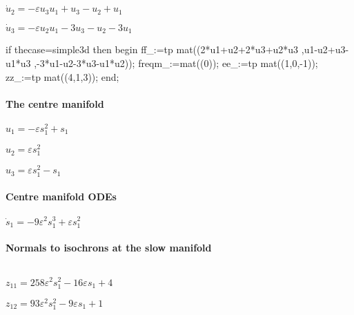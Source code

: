 \documentclass[11pt,a5paper]{article}
\def\eps{\varepsilon}
\begin{document}
\begin{math}
\dot u_{2}=-\varepsilon  u_{3} u_{1}+u_{3}-u_{2}+u_{1}
\end{math}\par

\begin{math}
\dot u_{3}=-\varepsilon  u_{2} u_{1}-3 u_{3}-u_{2}-3 u_{1}
\end{math}

\begin{reduce}
if thecase=simple3d then begin
ff_:=tp mat((2*u1+u2+2*u3+u2*u3
  ,u1-u2+u3-u1*u3
  ,-3*u1-u2-3*u3-u1*u2));
freqm_:=mat((0));
ee_:=tp mat((1,0,-1));
zz_:=tp mat((4,1,3));
end;
\end{reduce}


\paragraph{The centre manifold} 

\begin{math}
u_{1}=-\varepsilon  s_{1}^{2}+s_{1}
\end{math}\par

\begin{math}
u_{2}=\varepsilon  s_{1}^{2}
\end{math}\par

\begin{math}
u_{3}=\varepsilon  s_{1}^{2}-s_{1}
\end{math}\par


\paragraph{Centre manifold ODEs} 

\begin{math}
\dot s_{1}=-9 \varepsilon ^{2} s_{1}^{3}+\varepsilon  s_{1}^{2}
\end{math}

\paragraph{Normals to isochrons at the slow manifold}
\(
\)\par

\(z_{11}=258 \eps^{2} s_{1}^{2}-16 \eps s_{1}+4
\)\par

\(z_{12}=93 \eps^{2} s_{1}^{2}-9 \eps s_{1}+1
\)\par
\end{document}

